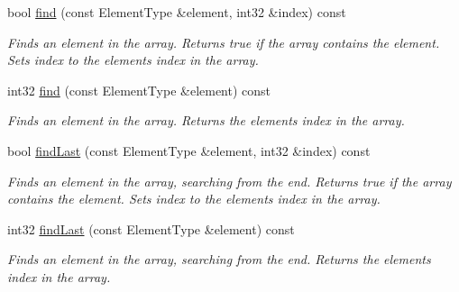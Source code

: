 \begin{DoxyCompactItemize}
\mbox{\label{class_arcana_1_1_array_aa521421243defb4b386e47222eeacd78}} 
bool \mbox{\hyperlink{class_arcana_1_1_array_aa521421243defb4b386e47222eeacd78}{find}} (const Element\+Type \&element, int32 \&index) const
\begin{DoxyCompactList}\small\item\em Finds an element in the array. Returns true if the array contains the element. Sets \textquotesingle{}index\textquotesingle{} to the element\textquotesingle{}s index in the array. \end{DoxyCompactList}\item 
\mbox{\label{class_arcana_1_1_array_a25f555ec9531e1f399bd29fce0220324}} 
int32 \mbox{\hyperlink{class_arcana_1_1_array_a25f555ec9531e1f399bd29fce0220324}{find}} (const Element\+Type \&element) const
\begin{DoxyCompactList}\small\item\em Finds an element in the array. Returns the element\textquotesingle{}s index in the array. \end{DoxyCompactList}\item 
\mbox{\label{class_arcana_1_1_array_a0c9b2fc7ca5813a37ddf1e16596b8866}} 
bool \mbox{\hyperlink{class_arcana_1_1_array_a0c9b2fc7ca5813a37ddf1e16596b8866}{find\+Last}} (const Element\+Type \&element, int32 \&index) const
\begin{DoxyCompactList}\small\item\em Finds an element in the array, searching from the end. Returns true if the array contains the element. Sets \textquotesingle{}index\textquotesingle{} to the element\textquotesingle{}s index in the array. \end{DoxyCompactList}\item 
\mbox{\label{class_arcana_1_1_array_aaf2c04e3072263bde3ea6c6e88104837}} 
int32 \mbox{\hyperlink{class_arcana_1_1_array_aaf2c04e3072263bde3ea6c6e88104837}{find\+Last}} (const Element\+Type \&element) const
\begin{DoxyCompactList}\small\item\em Finds an element in the array, searching from the end. Returns the element\textquotesingle{}s index in the array. \end{DoxyCompactList}\item 

\end{DoxyCompactItemize}
